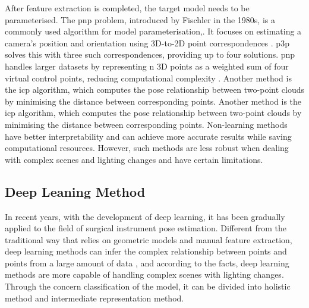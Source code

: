 \documentclass[12pt]{article}
\begin{document}
After feature extraction is completed, the target model needs to be parameterised. The  \gls{pnp} problem, introduced by Fischler in the 1980s, is a commonly used algorithm for model parameterisation,. It focuses on estimating a camera's position and orientation using 3D-to-2D point correspondences \cite{Lu_2018}. \gls{p3p} solves this with three such correspondences, providing up to four solutions. \gls{pnp} handles larger datasets by representing n 3D points as a weighted sum of four virtual control points, reducing computational complexity \cite{10.1007/s11263-008-0152-6}. Another method is the \gls{icp} algorithm\cite{bellekens2014survey}, which computes the pose relationship between two-point clouds by minimising the distance between corresponding points. Another method is the \gls{icp} algorithm\cite{bellekens2014survey}, which computes the pose relationship between two-point clouds by minimising the distance between corresponding points.
Non-learning methods have better interpretability and can achieve more accurate results while saving computational resources. However, such methods are less robust when dealing with complex scenes and lighting changes and have certain limitations\cite{bellekens2014survey}.


\subsection{Deep Leaning Method}
In recent years, with the development of deep learning, it has been gradually applied to the field of surgical instrument pose estimation. Different from the traditional way that relies on geometric models and manual feature extraction, deep learning methods can infer the complex relationship between points and points from a large amount of data \cite{ bellekens2014survey}, and according to the facts, deep learning methods are more capable of handling complex scenes with lighting changes\cite{fan2024reinforcement}. Through the concern classification of the model, it can be divided into holistic method and intermediate representation method.
\end{document}
